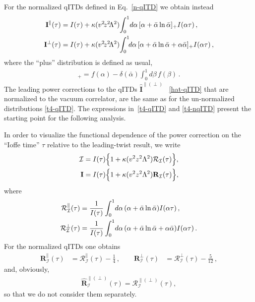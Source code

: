 \documentclass[aps,prd,twocolumn,a4paper,superscriptaddress,10pt,showpacs,notitlepage,floatfix]{revtex4-1}
\newcommand{\cI}{\mathcal{I}}
\newcommand{\cR}{\mathcal{R}}
\newcommand{\bI}{\mathbf{I}}
\newcommand{\bR}{\mathbf{R}}
\begin{document}
For the normalized qITDs defined in Eq.~\eqref{n-qITD} we obtain instead
\begin{align}
\label{t4-nqITD}
  \mathbf{I}^\parallel(\tau)
&= I(\tau) +
  \kappa (v^2\! z^2\!\Lambda^2) \!\int_0^1\!d\alpha \, [\alpha + \bar\alpha \ln \bar\alpha]_+I(\alpha \tau )\,,
\notag\\
  \mathbf{I}^\perp(\tau)
&= I(\tau) +
  \kappa (v^2\! z^2\!\Lambda^2) \!\int_0^1\!\!d\alpha \, [\alpha + \bar\alpha \ln \bar\alpha + \alpha\bar\alpha]_+I(\alpha \tau )\,,
\end{align} 
where the ``plus'' distribution is defined as usual,
\begin{align}
  [f(\alpha)]_+ = f(\alpha) - \delta(\bar\alpha)\int_0^1 d\beta\, f(\beta)\,. 
\end{align}
The leading power corrections to the qITDs 
$\widehat{\mathbf{I}}^{\parallel(\perp)}$ ~\eqref{hat-qITD} that are normalized to the vacuum correlator,
are the same as for the un-normalized distributions \eqref{t4-qITD}.
The expressions in~\eqref{t4-qITD} and \eqref{t4-nqITD} present the starting point for the following analysis.

In order to visualize the functional dependence of the power correction on the ``Ioffe time'' $\tau$ relative to the leading-twist result, we write 
\begin{align}
    \cI &= I(\tau)\Big\{ 1 + \kappa (v^2 z^2\Lambda^2) \cR_{\cI}(\tau)\Big\},
\notag\\
    \bI &= I(\tau)\Big\{ 1 + \kappa (v^2 z^2\Lambda^2) \bR_{\cI}(\tau)\Big\},
\end{align}
where
\begin{align}
\cR_{\cI}^\parallel(\tau) & = \frac{1}{I(\tau)} \int_0^1\!d\alpha \, 
(\alpha + \bar\alpha \ln \bar\alpha)I(\alpha \tau)\,,
\notag\\  
\cR_{\cI}^\perp(\tau)
& = \frac{1}{I(\tau)} \int_0^1\!d\alpha \, 
(\alpha + \bar\alpha \ln \bar\alpha + \alpha\bar\alpha)I(\alpha \tau)\,.
\end{align}
For the normalized qITDs one obtains 
\begin{align}
  \bR_{\cI}^\parallel(\tau) &= \cR_{\cI}^\parallel(\tau) - \frac14\,, 
\qquad
  \bR_{\cI}^\perp(\tau) &= \cR_{\cI}^\perp(\tau) - \frac5{12}\,, 
\end{align}
and, obviously, 
\begin{eqnarray}
\widehat{\bR}_{\cI}^{\parallel(\perp)}(\tau) = \cR_{\cI}^{\parallel(\perp)}(\tau),
\end{eqnarray}
so that we do not consider them separately.
\end{document}
